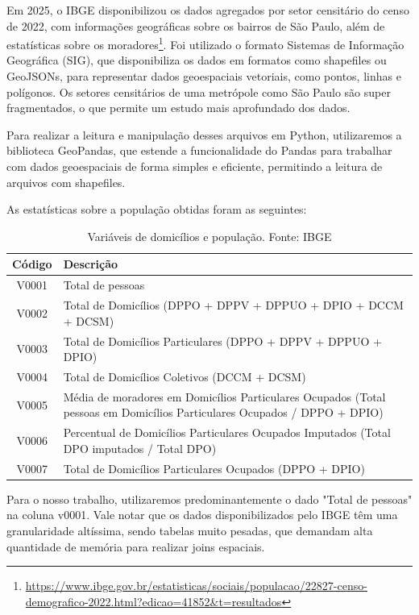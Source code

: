 Em 2025, o IBGE disponibilizou os dados agregados por setor censitário do censo de 2022, com informações geográficas sobre os bairros de São Paulo, além de estatísticas sobre os moradores\footnote{\url {https://www.ibge.gov.br/estatisticas/sociais/populacao/22827-censo-demografico-2022.html?edicao=41852\&t=resultados}}. Foi utilizado o formato Sistemas de Informação Geográfica (SIG), que disponibiliza os dados em formatos como shapefiles ou GeoJSONs, para representar dados geoespaciais vetoriais, como pontos, linhas e polígonos. Os setores censitários de uma metrópole como São Paulo são super fragmentados, o que permite um estudo mais aprofundado dos dados.

Para realizar a leitura e manipulação desses arquivos em Python, utilizaremos a biblioteca GeoPandas, que estende a funcionalidade do Pandas para trabalhar com dados geoespaciais de forma simples e eficiente, permitindo a leitura de arquivos com shapefiles. 

As estatísticas sobre a população obtidas foram as seguintes:

\begin{table}[H]
\centering
\begin{tabularx}{\textwidth}{|c|X|}
\hline
\textbf{Código} & \textbf{Descrição} \\
\hline
V0001 & Total de pessoas \\
V0002 & Total de Domicílios (DPPO + DPPV + DPPUO + DPIO + DCCM + DCSM) \\
V0003 & Total de Domicílios Particulares (DPPO + DPPV + DPPUO + DPIO) \\
V0004 & Total de Domicílios Coletivos (DCCM + DCSM) \\
V0005 & Média de moradores em Domicílios Particulares Ocupados (Total pessoas em Domicílios Particulares Ocupados / DPPO + DPIO) \\
V0006 & Percentual de Domicílios Particulares Ocupados Imputados (Total DPO imputados / Total DPO) \\
V0007 & Total de Domicílios Particulares Ocupados (DPPO + DPIO) \\
\hline
\end{tabularx}
\caption{Variáveis de domicílios e população. Fonte: IBGE}
\label{tab:variaveis_domicilios_populacao}
\end{table}

Para o nosso trabalho, utilizaremos predominantemente o dado "Total de pessoas" na coluna v0001. Vale notar que os dados disponibilizados pelo IBGE têm uma granularidade altíssima, sendo tabelas muito pesadas, que demandam alta quantidade de memória para realizar joins espaciais. 

